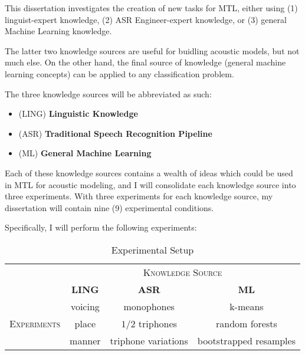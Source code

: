 \documentclass[10pt,a4paper]{article}
\begin{document}
This dissertation investigates the creation of new tasks for MTL, either using (1) linguist-expert knowledge, (2) ASR Engineer-expert knowledge, or (3) general Machine Learning knowledge.

The latter two knowledge sources are useful for buidling acoustic models, but not much else. On the other hand, the final source of knowledge (general machine learning concepts) can be applied to any classification problem.

The three knowledge sources will be abbreviated as such:
  
\begin{itemize}
\item  (\textsc{LING}) \textbf{Linguistic Knowledge} 
\item (\textsc{ASR}) \textbf{Traditional Speech Recognition Pipeline}
\item (\textsc{ML}) \textbf{General Machine Learning}
\end{itemize}


Each of these knowledge sources contains a wealth of ideas which could be used in MTL for acoustic modeling, and I will consolidate each knowledge source into three experiments. With three experiments for each knowledge source, my dissertation will contain nine (9) experimental conditions.

Specifically, I will perform the following experiments:

\begin{table}[htbp]
  \centering
  \begin{adjustbox}{width=.75\textwidth}
    \begin{tabular}{cccc}
      \toprule
      & \multicolumn{3}{c}{\textsc{Knowledge Source}}\\
      & \textbf{LING} & \textbf{ASR} & \textbf{ML}\\
      \midrule
      \multirow{3}{*}{\textsc{Experiments}} & voicing & monophones &  k-means \\
      & place & $1/2$ triphones & random forests  \\
      & manner & triphone variations &  bootstrapped resamples  \\
      \bottomrule
    \end{tabular}
    \label{table:data}
  \end{adjustbox}
  
  \caption{Experimental Setup}
  
\end{table}
\end{document}
